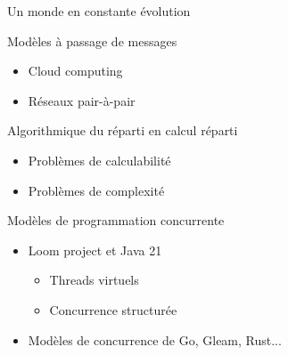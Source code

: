 
\begingroup

\begin{frame}[fragile]{Un monde en constante évolution}

 \begin{block}{Modèles à passage de messages}
    \begin{itemize}
    \item Cloud computing
    \item Réseaux pair-à-pair
    \end{itemize}
  \end{block}

 \begin{block}{Algorithmique du réparti en calcul réparti}
    \begin{itemize}
    \item Problèmes de calculabilité
    \item Problèmes de complexité
    \end{itemize}
 \end{block}

   \begin{block}{Modèles de programmation concurrente}
    \begin{itemize}
    \item Loom project et Java 21
    \begin{itemize}
    \item Threads virtuels
    \item Concurrence structurée
    \end{itemize}
    \item Modèles de concurrence de Go, Gleam, Rust...
    \end{itemize}
  \end{block}
\end{frame}

\endgroup
\endinput

